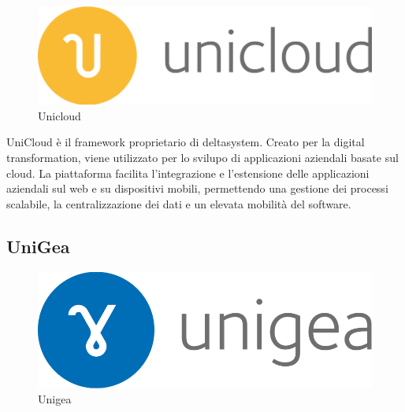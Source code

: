 \documentclass[target=bach,aauheader=,style=]{thud}
\begin{document}
\begin{figure}
    \begin{center}
        \includegraphics[height=0.06\textheight]{unicloud.png}
    \end{center}
    \caption{Unicloud}
\end{figure}


UniCloud è il framework proprietario di deltasystem. Creato per la digital transformation, viene utilizzato per lo svilupo di applicazioni aziendali basate sul cloud. 
La piattaforma facilita l’integrazione e l’estensione delle applicazioni aziendali sul web e su dispositivi mobili, permettendo una gestione dei processi scalabile, la centralizzazione dei dati e un elevata mobilità del software.





\subsection{UniGea}

\begin{figure}
    \begin{center}
        \includegraphics[height=0.06\textheight]{unigea.png}
    \end{center}
    \caption{Unigea}
\end{figure}
\end{document}
